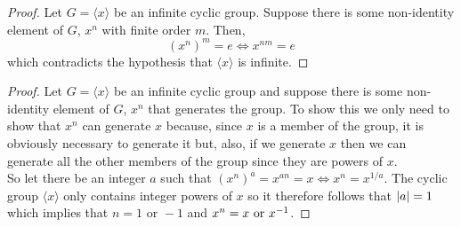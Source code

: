 \documentclass[MathsNotesBase.tex]{subfiles}
\begin{document}
{		
		\begin{proof}
			Let ${ G = \langle x \rangle }$ be an infinite cyclic group. Suppose there is some non-identity element of $G$, ${ x^n }$ with finite order $m$. Then,
			\[ (x^n)^m = e \iff x^{nm} = e \]
			which contradicts the hypothesis that ${ \langle x \rangle }$ is infinite.
		\end{proof}
	
		\begin{proof}
			Let ${ G = \langle x \rangle }$ be an infinite cyclic group and suppose there is some non-identity element of $G$, ${ x^n }$ that generates the group. To show this we only need to show that ${ x^n }$ can generate $x$ because, since $x$ is a member of the group, it is obviously necessary to generate it but, also, if we generate $x$ then we can generate all the other members of the group since they are powers of $x$.\\
			So let there be an integer $a$ such that ${ (x^n)^a = x^{an} = x \iff x^n = x^{1/a} }$. The cyclic group ${ \langle x \rangle }$ only contains integer powers of $x$ so it therefore follows that ${ \left\lvert a\right\rvert = 1 }$ which implies that ${ n = 1 \text{ or } -1 }$ and ${ x^n = x \text{ or } {x}^{-1} }$.
		\end{proof}
	
}
\end{document}
